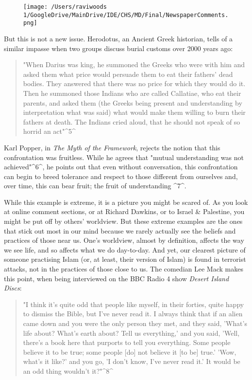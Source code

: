 \documentclass[]{article}
\begin{document}
\begin{figure}
\centering
\texttt{[image: /Users/raviwoods 1/GoogleDrive/MainDrive/IDE/CHS/MD/Final/NewspaperComments.png]}
\caption{}
\end{figure}

But this is not a new issue. Herodotus, an Ancient Greek historian,
tells of a similar impasse when two groups discuss burial customs over
2000 years ago:

\begin{quote}
"When Darius was king, he summoned the Greeks who were with him and
asked them what price would persuade them to eat their fathers' dead
bodies. They answered that there was no price for which they would do
it. Then he summoned those Indians who are called Callatiae, who eat
their parents, and asked them (the Greeks being present and
understanding by interpretation what was said) what would make them
willing to burn their fathers at death. The Indians cried aloud, that he
should not speak of so horrid an act"\^{}5\^{}
\end{quote}

Karl Popper, in \emph{The Myth of the Framework}, rejects the notion
that this confrontation was fruitless. While he agrees that "mutual
understanding was not achieved"\^{}6\^{}, he points out that even
without conversation, this confrontation can begin to breed tolerance
and respect to those different from ourselves and, over time, this can
bear fruit; the fruit of understanding \^{}7\^{}.

While this example is extreme, it is a picture you might be scared of.
As you look at online comment sections, or at Richard Dawkins, or to
Israel \& Palestine, you might be put off by others' worldview. But
these extreme examples are the ones that stick out most in our mind
because we rarely actually see the beliefs and practices of those near
us. One's worldview, almost by definition, affects the way we see life,
and so affects what we do day-to-day. And yet, our clearest picture of
someone practising Islam (or, at least, their version of Islam) is found
in terrorist attacks, not in the practices of those close to us. The
comedian Lee Mack makes this point, when being interviewed on the BBC
Radio 4 show \emph{Desert Island Discs}:

\begin{quote}
"I think it's quite odd that people like myself, in their forties, quite
happy to dismiss the Bible, but I've never read it. I always think that
if an alien came down and you were the only person they met, and they
said, 'What's life about? What's earth about? Tell us everything,' and
you said, 'Well, there's a book here that purports to tell you
everything. Some people believe it to be true; some people {[}do{]} not
believe it {[}to be{]} true.' 'Wow, what's it like?' and you go, 'I
don't know, I've never read it.' It would be an odd thing wouldn't
it?"\^{}8\^{}
\end{quote}
\end{document}
